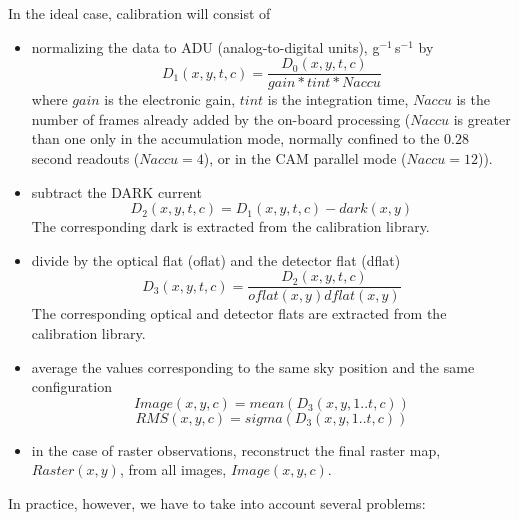In the ideal case, calibration will consist of 
\begin{itemize}

\item normalizing the data to ADU (analog-to-digital units), 
g$^{-1}$\,s$^{-1}$ by 
\[ D_1(x,y,t,c) = \frac{D_0(x,y,t,c)}{gain*tint*Naccu} \]
where $gain$ is the electronic gain, $tint$ is the integration time,
$Naccu$ is the number of frames already added by the on-board
processing ($Naccu$ is greater than one only in the accumulation mode,
normally confined to the $0.28$ second readouts ($Naccu=4$), or in
the CAM parallel mode ($Naccu=12$)).

\item subtract the DARK current  
\[ D_2(x,y,t,c) = D_1(x,y,t,c) - dark(x,y) \]
The corresponding dark is extracted from the calibration library.
\item divide by the optical flat (oflat) and the detector flat (dflat)
\[ D_3(x,y,t,c) = \frac{D_2(x,y,t,c)}{oflat(x,y)dflat(x,y)} \]
The corresponding optical and detector flats are extracted from the
calibration library.

\item average the values corresponding to the same sky position and the same 
configuration
\[ Image(x,y,c) = mean(D_3(x,y,1..t,c)) \]
\[ RMS(x,y,c) =  sigma(D_3(x,y,1..t,c)) \]

\item in the case of raster observations, reconstruct the final raster
map, $Raster(x,y)$, from all images, $Image(x,y,c)$.

\end{itemize}

In practice, however, we have to take into account several problems:

